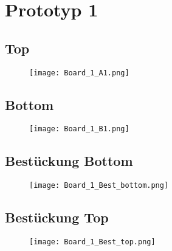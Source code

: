 






\section{Prototyp 1}

\subsection*{Top}
\begin{figure}[htb]
\begin{center}
\texttt{[image: Board\_1\_A1.png]}
\end{center}
\end{figure}

\newpage
\subsection*{Bottom}
\begin{figure}[htb]
\begin{center}
\texttt{[image: Board\_1\_B1.png]}
\end{center}
\end{figure}

\newpage
\subsection*{Bestückung Bottom}
\begin{figure}[htb]
\begin{center}
\texttt{[image: Board\_1\_Best\_bottom.png]}
\end{center}
\end{figure}

\newpage
\subsection*{Bestückung Top}
\begin{figure}[htb]
\begin{center}
\texttt{[image: Board\_1\_Best\_top.png]}
\end{center}
\end{figure}





